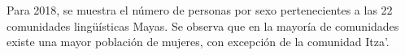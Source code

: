 Para 2018, se muestra el número de personas por sexo pertenecientes a las 22 comunidades lingüísticas Mayas. Se observa que en la mayoría de comunidades existe una mayor población de mujeres, con excepción de la comunidad Itza’.